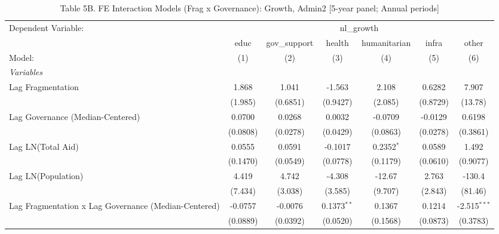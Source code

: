 
\begin{table}[H]
   \caption{Table 5B. FE Interaction Models (Frag x Governance): Growth, Admin2 [5-year panel; Annual periods]}
   \centering
   \begin{tabular}{lcccccc}
      \tabularnewline \midrule \midrule
      Dependent Variable: & \multicolumn{6}{c}{nl\_growth}\\
                                                           & educ     & gov\_support  & health        & humanitarian & infra    & other \\   
      Model:                                               & (1)      & (2)           & (3)           & (4)          & (5)      & (6)\\  
      \midrule
      \emph{Variables}\\
      Lag Fragmentation                                    & 1.868    & 1.041         & -1.563        & 2.108        & 0.6282   & 7.907\\   
                                                           & (1.985)  & (0.6851)      & (0.9427)      & (2.085)      & (0.8729) & (13.78)\\   
      Lag Governance (Median-Centered)                     & 0.0700   & 0.0268        & 0.0032        & -0.0709      & -0.0129  & 0.6198\\   
                                                           & (0.0808) & (0.0278)      & (0.0429)      & (0.0863)     & (0.0278) & (0.3861)\\   
      Lag LN(Total Aid)                                    & 0.0555   & 0.0591        & -0.1017       & 0.2352$^{*}$ & 0.0589   & 1.492\\   
                                                           & (0.1470) & (0.0549)      & (0.0778)      & (0.1179)     & (0.0610) & (0.9077)\\   
      Lag LN(Population)                                   & 4.419    & 4.742         & -4.308        & -12.67       & 2.763    & -130.4\\   
                                                           & (7.434)  & (3.038)       & (3.585)       & (9.707)      & (2.843)  & (81.46)\\   
      Lag Fragmentation x Lag Governance (Median-Centered) & -0.0757  & -0.0076       & 0.1373$^{**}$ & 0.1367       & 0.1214   & -2.515$^{***}$\\   
                                                           & (0.0889) & (0.0392)      & (0.0520)      & (0.1568)     & (0.0873) & (0.3783)\\   

\end{tabular}
\end{table}
